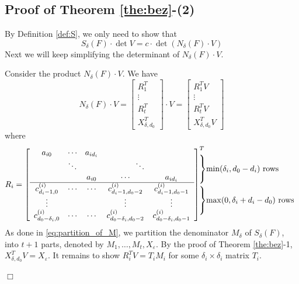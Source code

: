 \documentclass{article}
\newenvironment{proof}{\noindent{\em Proof:}}{$\Box$~\\}
\begin{document}
\subsection{Proof of Theorem \ref{the:bez}-(2)}
\begin{proof}
By Definition \ref{def:S}, we only need to show that
  $${S_\delta }(F) \cdot \det V =  c \cdot \det (N_\delta (F) \cdot V)$$
Next we will keep simplifying the  determinant of $N_\delta (F) \cdot V$.

Consider the product $N_\delta (F) \cdot V$. We have
$$N_\delta (F) \cdot V=\begin{bmatrix}
R_1^T\\[3pt]\vdots\\[3pt]R_t^T\\[3pt]X_{\delta ,{d_0}}^T
\end{bmatrix}\cdot V=\begin{bmatrix}
R_1^TV\\[3pt]\vdots\\[3pt]R_t^T V\\[3pt]X_{\delta ,{d_0}} ^TV
\end{bmatrix}$$
where
\[
{R_i} =
\setlength{\arraycolsep}{5pt}{\left[ {\begin{array}{*{20}{c}}
{{a_{i0}}}& \cdots &{{a_{i{d_i}}}}&{}&{}\\
{}& \ddots &{}& ~~~~~~~~~~~\ddots &{}\\
{}&{}&{{a_{i0}}}& \cdots &{{a_{i{d_i}}}}\\
\hline
{c_{d_i-1,0}^{(i)}}& \cdots&\cdots &{c_{d_i-1,{d_0} - 2}^{(i)}}&{c_{d_i-1,{d_0} - 1}^{(i)}}\\
 \vdots & & &\vdots & \vdots \\
{c_{d_{0}-\delta_i,0}^{(i)}}& \cdots&\cdots &{c_{d_{0}-\delta_i,{d_0} - 2}^{(i)}}&{c_{d_{0}-\delta_i,{d_0} - 1}^{(i)}}
\end{array}} \right]^T}\hspace{-2.3em}\begin{array}{*{20}{l}}
{\left. {\begin{array}{*{20}{c}}
{}\\
{}\\
{}
\end{array}} \right\}}{\min ({\delta _i},{d_0} - {d_i})\text{~rows}}\\[15pt]
{\left. {\begin{array}{*{20}{c}}
{}\\
{}\\
{}
\end{array}} \right\}}{\max (0,{\delta _i} + {d_i} - {d_0})\text{~rows}}
\end{array}\]
As done in \eqref{eq:partition_of_M}, we partition the denominator $M_{\delta}$ of $S_\delta (F)$, into $t+1$ parts, denoted by $M_1,\ldots,M_t,X_{\varepsilon}$.
By the proof of Theorem \ref{the:bez}-1, $X_{\delta,d_0}^TV=X_{\varepsilon}$. It remains to show $R_i^TV=T_iM_i$ for some $\delta_i\times \delta_i$ matrix $T_i$.


\end{proof}
\end{document}
